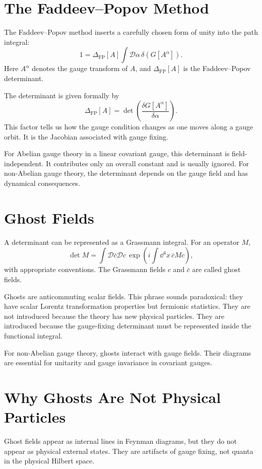 \section{The Faddeev--Popov Method}

The Faddeev--Popov method inserts a carefully chosen form of unity into the path
integral:
\[
    1=\Delta_{\mathrm{FP}}[A]
      \int\mathcal{D}\alpha\,\delta(G[A^\alpha]).
\]
Here \(A^\alpha\) denotes the gauge transform of \(A\), and
\(\Delta_{\mathrm{FP}}[A]\) is the Faddeev--Popov determinant.

The determinant is given formally by
\[
    \Delta_{\mathrm{FP}}[A]
    = \det\left(\frac{\delta G[A^\alpha]}{\delta\alpha}\right).
\]
This factor tells us how the gauge condition changes as one moves along a gauge
orbit. It is the Jacobian associated with gauge fixing.

For Abelian gauge theory in a linear covariant gauge, this determinant is
field-independent. It contributes only an overall constant and is usually
ignored. For non-Abelian gauge theory, the determinant depends on the gauge
field and has dynamical consequences.

\section{Ghost Fields}

A determinant can be represented as a Grassmann integral. For an operator \(M\),
\[
    \det M
    = \int\mathcal{D}\bar c\mathcal{D}c\,
      \exp\left(i\int\dd^4x\,\bar c M c\right),
\]
with appropriate conventions. The Grassmann fields \(c\) and \(\bar c\) are
called ghost fields.

Ghosts are anticommuting scalar fields. This phrase sounds paradoxical: they
have scalar Lorentz transformation properties but fermionic statistics. They are
not introduced because the theory has new physical particles. They are
introduced because the gauge-fixing determinant must be represented inside the
functional integral.

For non-Abelian gauge theory, ghosts interact with gauge fields. Their diagrams
are essential for unitarity and gauge invariance in covariant gauges.

\section{Why Ghosts Are Not Physical Particles}

Ghost fields appear as internal lines in Feynman diagrams, but they do not
appear as physical external states. They are artifacts of gauge fixing, not
quanta in the physical Hilbert space.

